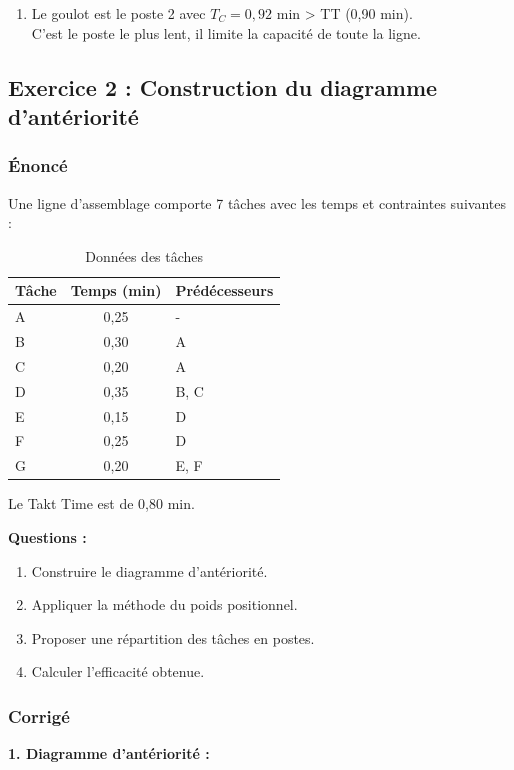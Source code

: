 \documentclass[12pt,a4paper]{article}
\begin{document}
\begin{center}
\begin{enumerate}
    \item Le goulot est le poste 2 avec \(T_C = 0,92\) min > TT (0,90 min). \\
    C'est le poste le plus lent, il limite la capacité de toute la ligne.
\end{enumerate}

\subsection{Exercice 2 : Construction du diagramme d’antériorité}
\subsubsection{Énoncé}
Une ligne d’assemblage comporte 7 tâches avec les temps et contraintes suivantes :

\begin{table}[H]
\centering
\begin{tabular}{|l|c|l|}
\hline
\textbf{Tâche} & \textbf{Temps (min)} & \textbf{Prédécesseurs} \\ \hline
A & 0,25 & - \\
B & 0,30 & A \\
C & 0,20 & A \\
D & 0,35 & B, C \\
E & 0,15 & D \\
F & 0,25 & D \\
G & 0,20 & E, F \\ \hline
\end{tabular}
\caption{Données des tâches}
\label{tab:ex2_taches}
\end{table}

Le Takt Time est de 0,80 min.

\textbf{Questions :}
\begin{enumerate}
    \item Construire le diagramme d’antériorité.
    \item Appliquer la méthode du poids positionnel.
    \item Proposer une répartition des tâches en postes.
    \item Calculer l’efficacité obtenue.
\end{enumerate}

\subsubsection{Corrigé}

\textbf{1. Diagramme d’antériorité :}


\end{center}
\end{document}
